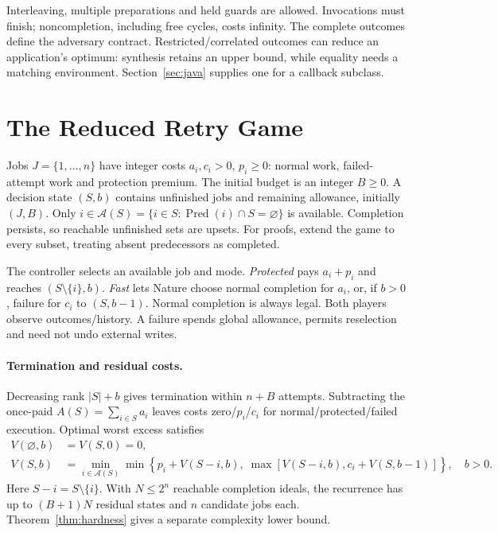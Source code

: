 \documentclass[acmsmall,screen,review,anonymous]{acmart}
\begin{document}
Interleaving, multiple preparations and held guards are allowed. Invocations must finish; noncompletion, including free cycles, costs infinity. The complete outcomes define the adversary contract. Restricted/correlated outcomes can reduce an application's optimum: synthesis retains an upper bound, while equality needs a matching environment. Section~\ref{sec:java} supplies one for a callback subclass.

\section{The Reduced Retry Game}
\label{sec:model}

Jobs $J=\{1,\ldots,n\}$ have integer costs $a_i,c_i>0$, $p_i\ge0$: normal work, failed-attempt work and protection premium. The initial budget is an integer $B\ge0$. A decision state $(S,b)$ contains unfinished jobs and remaining allowance, initially $(J,B)$. Only $i\in\mathcal A(S)=\{i\in S:\operatorname{Pred}(i)\cap S=\varnothing\}$ is available. Completion persists, so reachable unfinished sets are upsets. For proofs, extend the game to every subset, treating absent predecessors as completed.

The controller selects an available job and mode. \emph{Protected} pays $a_i+p_i$ and reaches $(S\setminus\{i\},b)$. \emph{Fast} lets Nature choose normal completion for $a_i$, or, if $b>0$, failure for $c_i$ to $(S,b-1)$. Normal completion is always legal. Both players observe outcomes/history. A failure spends global allowance, permits reselection and need not undo external writes.

\paragraph{Termination and residual costs.}
Decreasing rank $|S|+b$ gives termination within $n+B$ attempts. Subtracting the once-paid $A(S)=\sum_{i\in S}a_i$ leaves costs zero/$p_i$/$c_i$ for normal/protected/failed execution. Optimal worst excess satisfies
\begin{align}
 V(\varnothing,b)&=V(S,0)=0,\\
 V(S,b)&=\min_{i\in\mathcal A(S)}\min\left\{p_i+V(S-i,b),\;
 \max\left[V(S-i,b),c_i+V(S,b-1)\right]\right\},\quad b>0.
 \label{eq:bellman}
\end{align}
Here $S-i=S\setminus\{i\}$. With $N\le2^n$ reachable completion ideals, the recurrence has up to $(B+1)N$ residual states and $n$ candidate jobs each. Theorem~\ref{thm:hardness} gives a separate complexity lower bound.
\end{document}
